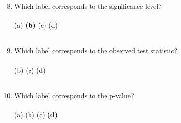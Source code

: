 \documentclass[12pt]{article}
\begin{document}
\begin{enumerate}[leftmargin=\labelsep]
\setcounter{enumi}{7}
\item Which label corresponds to the significance level?\\
\vspace*{.5cm}\\
\hspace*{1cm}(a) \hfill {\bf (b)} \hfill  (c) \hfill (d)\hspace*{1cm}\\
\vspace*{.5cm}\\

\item Which label corresponds to the observed test statistic?\\
\vspace*{.5cm}\\
\hspace*{1cm}{\bf (a)} \hfill (b) \hfill (c) \hfill (d)\hspace*{1cm}\\
\vspace*{.5cm}\\

\item Which label corresponds to the p-value?\\
\vspace*{.5cm}\\
\hspace*{1cm} (a) \hfill (b) \hfill (c) \hfill {\bf (d)}\hspace*{1cm}\\
\vspace*{.5cm}\\
\end{enumerate}
\end{document}
